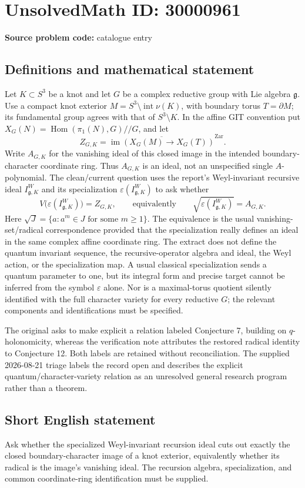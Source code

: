 \documentclass[11pt]{article}
\begin{document}
\section*{UnsolvedMath ID: 30000961}
\textbf{Source problem code:} catalogue entry
\subsection{Definitions and mathematical statement}
Let $K\subset S^3$ be a knot and let $G$ be a complex reductive group with Lie algebra $\mathfrak g$. Use a compact knot exterior $M=S^3\setminus\operatorname{int}\nu(K)$, with boundary torus $T=\partial M$; its fundamental group agrees with that of $S^3\setminus K$. In the affine GIT convention put $X_G(N)=\operatorname{Hom}(\pi_1(N),G)//G$, and let \[Z_{G,K}=\overline{\operatorname{im}(X_G(M)\to X_G(T))}^{\mathrm{Zar}}.\] Write $A_{G,K}$ for the vanishing ideal of this closed image in the intended boundary-character coordinate ring. Thus $A_{G,K}$ is an ideal, not an unspecified single $A$-polynomial. The clean/current question uses the report's Weyl-invariant recursive ideal $I^W_{\mathfrak g,K}$ and its specialization $\varepsilon(I^W_{\mathfrak g,K})$ to ask whether \[V\bigl(\varepsilon(I^W_{\mathfrak g,K})\bigr)=Z_{G,K},\qquad\text{equivalently}\qquad\sqrt{\varepsilon(I^W_{\mathfrak g,K})}=A_{G,K}.\] Here $\sqrt J=\{a:a^m\in J\text{ for some }m\geq1\}$. The equivalence is the usual vanishing-set/radical correspondence provided that the specialization really defines an ideal in the same complex affine coordinate ring. The extract does not define the quantum invariant sequence, the recursive-operator algebra and ideal, the Weyl action, or the specialization map. A usual classical specialization sends a quantum parameter to one, but its integral form and precise target cannot be inferred from the symbol $\varepsilon$ alone. Nor is a maximal-torus quotient silently identified with the full character variety for every reductive $G$; the relevant components and identifications must be specified.\par The original asks to make explicit a relation labeled Conjecture 7, building on $q$-holonomicity, whereas the verification note attributes the restored radical identity to Conjecture 12. Both labels are retained without reconciliation. The supplied 2026-08-21 triage labels the record open and describes the explicit quantum/character-variety relation as an unresolved general research program rather than a theorem.
\subsection{Short English statement}
Ask whether the specialized Weyl-invariant recursion ideal cuts out exactly the closed boundary-character image of a knot exterior, equivalently whether its radical is the image's vanishing ideal. The recursion algebra, specialization, and common coordinate-ring identification must be supplied.
\end{document}
